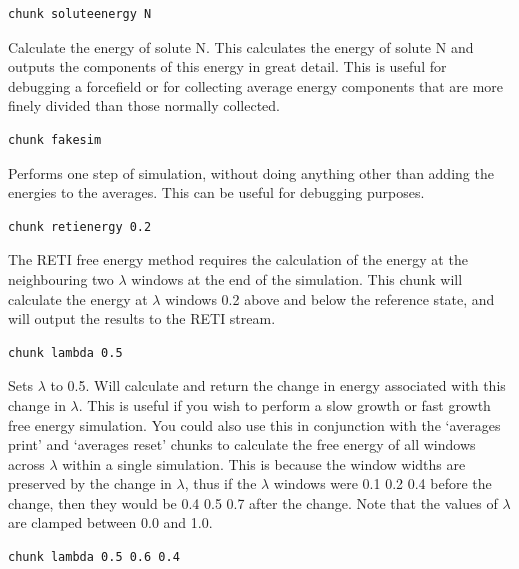 \documentclass[letterpaper,10pt,english]{sphinxmanual}
\begin{document}
\begin{Verbatim}[commandchars=\\\{\}]
chunk soluteenergy N
\end{Verbatim}

Calculate the energy of solute N. This calculates the energy of solute N and outputs the components of this energy in great detail. This is useful for debugging a forcefield or for collecting average energy components that are more finely divided than those normally collected.

\begin{Verbatim}[commandchars=\\\{\}]
chunk fakesim
\end{Verbatim}

Performs one step of simulation, without doing anything other than adding the energies to the averages. This can be useful for debugging purposes.

\begin{Verbatim}[commandchars=\\\{\}]
chunk retienergy 0.2
\end{Verbatim}

The RETI free energy method requires the calculation of the energy at the neighbouring two \(\lambda\) windows at the end of the simulation. This chunk will calculate the energy at \(\lambda\) windows 0.2 above and below the reference state, and will output the results to the RETI stream.

\begin{Verbatim}[commandchars=\\\{\}]
chunk lambda 0.5
\end{Verbatim}

Sets \(\lambda\) to 0.5. Will calculate and return the change in energy associated with this change in \(\lambda\). This is useful if you wish to perform a slow growth or fast growth free energy simulation. You could also use this in conjunction with the ‘averages print’ and ‘averages reset’ chunks to calculate the free energy of all windows across \(\lambda\) within a single simulation. This is because the window widths are preserved by the change in \(\lambda\), thus if the \(\lambda\) windows were 0.1 0.2 0.4 before the change, then they would be 0.4 0.5 0.7 after the change. Note that the values of \(\lambda\) are clamped between 0.0 and 1.0.

\begin{Verbatim}[commandchars=\\\{\}]
chunk lambda 0.5 0.6 0.4
\end{Verbatim}
\end{document}

